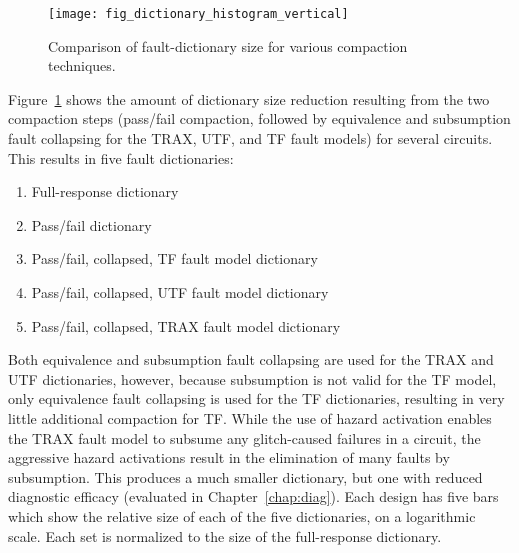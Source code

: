 \begin{figure}[htbp]
\centering
\texttt{[image: fig\_dictionary\_histogram\_vertical]}
\caption{Comparison of fault-dictionary size for various compaction techniques.}
\label{fig:dict_histogram}
\end{figure}

Figure~\ref{fig:dict_histogram} shows the amount of dictionary size reduction resulting from the two compaction steps (pass/fail compaction, followed by equivalence and subsumption fault collapsing for the TRAX, UTF, and TF fault models) for several circuits.
%
This results in five fault dictionaries:
\begin{enumerate}
\item Full-response dictionary
\item Pass/fail dictionary
\item Pass/fail, collapsed, TF fault model dictionary
\item Pass/fail, collapsed, UTF fault model dictionary
\item Pass/fail, collapsed, TRAX fault model dictionary
\end{enumerate}
Both equivalence and subsumption fault collapsing are used for the TRAX and UTF dictionaries, however, because subsumption is not valid for the TF model, only equivalence fault collapsing is used for the TF dictionaries, resulting in very little additional compaction for TF.
%
While the use of hazard activation enables the TRAX fault model to subsume any glitch-caused failures in a circuit, the aggressive hazard activations result in the elimination of many faults by subsumption.
%
This produces a much smaller dictionary, but one with reduced diagnostic efficacy (evaluated in Chapter~\ref{chap:diag}).
%
Each design has five bars which show the relative size of each of the five dictionaries, on a logarithmic scale.
%
Each set is normalized to the size of the full-response dictionary.

